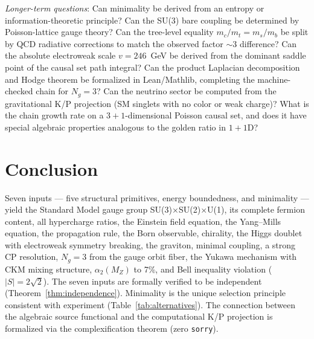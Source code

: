 \documentclass[12pt,a4paper]{article}
\begin{document}
\emph{Longer-term questions}: Can minimality be derived from an entropy or information-theoretic principle? Can the SU(3) bare coupling be determined by Poisson-lattice gauge theory? Can the tree-level equality $m_c/m_t = m_s/m_b$ be split by QCD radiative corrections to match the observed factor $\sim$3 difference? Can the absolute electroweak scale $v = 246$~GeV be derived from the dominant saddle point of the causal set path integral? Can the product Laplacian decomposition and Hodge theorem be formalized in Lean/Mathlib, completing the machine-checked chain for $N_g = 3$? Can the neutrino sector be computed from the gravitational K/P projection (SM singlets with no color or weak charge)? What is the chain growth rate on a $3{+}1$-dimensional Poisson causal set, and does it have special algebraic properties analogous to the golden ratio in $1{+}1$D?

\section{Conclusion}

Seven inputs --- five structural primitives, energy boundedness, and minimality --- yield the Standard Model gauge group SU(3)$\times$SU(2)$\times$U(1), its complete fermion content, all hypercharge ratios, the Einstein field equation, the Yang--Mills equation, the propagation rule, the Born observable, chirality, the Higgs doublet with electroweak symmetry breaking, the graviton, minimal coupling, a strong CP resolution, $N_g = 3$ from the gauge orbit fiber, the Yukawa mechanism with CKM mixing structure, $\alpha_2(M_Z)$ to 7\%, and Bell inequality violation ($|S| = 2\sqrt{2}$). The seven inputs are formally verified to be independent (Theorem~\ref{thm:independence}). Minimality is the unique selection principle consistent with experiment (Table~\ref{tab:alternatives}). The connection between the algebraic source functional and the computational K/P projection is formalized via the complexification theorem (zero \texttt{sorry}).
\end{document}

